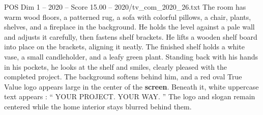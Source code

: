 \begin{textsample}{POS Dim 1 – 2020 – Score 15.00 – 2020/tv\_com\_2020\_26.txt}
The room has warm wood floors, a patterned rug, a sofa with colorful pillows, a chair, plants, shelves, and a fireplace in the background.
He holds the level against a pale wall and adjusts it carefully, then fastens shelf brackets.
He lifts a wooden shelf board into place on the brackets, aligning it neatly.
The finished shelf holds a white vase, a small candleholder, and a leafy green plant.
Standing back with his hands in his pockets, he looks at the shelf and smiles, clearly pleased with the completed project.
The background softens behind him, and a red oval True Value logo appears large in the center of the \textbf{screen}.
Beneath it, white uppercase text appears : “ YOUR PROJECT.
YOUR WAY. ” The logo and slogan remain centered while the home interior stays blurred behind them.

\end{textsample}
